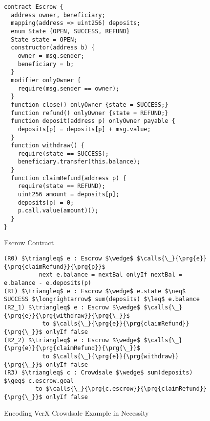 \begin{figure}[htb]
\begin{lstlisting}[language=chainmail]
contract Escrow {
  address owner, beneficiary;
  mapping(address => uint256) deposits;
  enum State {OPEN, SUCCESS, REFUND}
  State state = OPEN;
  constructor(address b) {
    owner = msg.sender;
    beneficiary = b;
  }
  modifier onlyOwner {
    require(msg.sender == owner);
  }
  function close() onlyOwner {state = SUCCESS;}
  function refund() onlyOwner {state = REFUND;}
  function deposit(address p) onlyOwner payable {
    deposits[p] = deposits[p] + msg.value;
  }
  function withdraw() {
    require(state == SUCCESS);
    beneficiary.transfer(this.balance);
  }
  function claimRefund(address p) {
    require(state == REFUND);
    uint256 amount = deposits[p];
    deposits[p] = 0;
    p.call.value(amount)();
  }
}
\end{lstlisting}
\caption{Escrow Contract}
\label{f:verx:escrow}
\end{figure}

\begin{figure}[htb]
\begin{lstlisting}[mathescape=true, language=chainmail]
(R0) $\triangleq$ e : Escrow $\wedge$ $\calls{\_}{\prg{e}}{\prg{claimRefund}}{\prg{p}}$
          next e.balance = nextBal onlyIf nextBal = e.balance - e.deposits(p)
(R1) $\triangleq$ e : Escrow $\wedge$ e.state $\neq$ SUCCESS $\longrightarrow$ sum(deposits) $\leq$ e.balance
(R2_1) $\triangleq$ e : Escrow $\wedge$ $\calls{\_}{\prg{e}}{\prg{withdraw}}{\prg{\_}}$
           to $\calls{\_}{\prg{e}}{\prg{claimRefund}}{\prg{\_}}$ onlyIf false
(R2_2) $\triangleq$ e : Escrow $\wedge$ $\calls{\_}{\prg{e}}{\prg{claimRefund}}{\prg{\_}}$
           to $\calls{\_}{\prg{e}}{\prg{withdraw}}{\prg{\_}}$ onlyIf false
(R3) $\triangleq$ c : Crowdsale $\wedge$ sum(deposits) $\geq$ c.escrow.goal
         to $\calls{\_}{\prg{c.escrow}}{\prg{claimRefund}}{\prg{\_}}$ onlyIf false
\end{lstlisting}
\caption{Encoding VerX Crowdsale Example in Necessity}
\label{f:verx:encoding}
\end{figure}